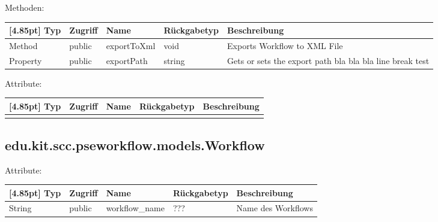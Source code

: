             Methoden:
            \begin{center}
	            \setlength\tabcolsep{5pt}
	            \renewcommand{\arraystretch}{1.5}
	            
                \begin{tabularx}{\textwidth}{|l|l|l|l|X|}
                    \hline
                    \rowcolor[gray]{0.75}[4.85pt]
                    Typ & Zugriff & Name & Rückgabetyp & Beschreibung \\ \hline 
                    Method & public & exportToXml & void & Exports Workflow to XML File \\ \hline
                    Property & public & exportPath & string & Gets or sets the export path bla bla bla line break test\\
                    \hline
                \end{tabularx}
            \end{center}
                
            Attribute:
            \begin{center}
            	\renewcommand{\arraystretch}{1.5}
	            \setlength\tabcolsep{5pt}
            	\begin{tabularx}{\textwidth}{|l|l|l|l|X|}
            		\hline
                    \rowcolor[gray]{0.75}[4.85pt]            		
            	    Typ & Zugriff & Name & Rückgabetyp & Beschreibung \\ \hline 
            	   	&&&&\\
            		\hline
            	\end{tabularx}
            \end{center}
%            
%        
        \subsection{edu.kit.scc.pseworkflow.models.Workflow}
            Attribute:
            \begin{center}
            	\renewcommand{\arraystretch}{1.5}
	            \setlength\tabcolsep{5pt}
            	\begin{tabularx}{\textwidth}{|l|l|l|l|X|}
            		\hline
                    \rowcolor[gray]{0.75}[4.85pt]            		
            	    Typ & Zugriff & Name & Rückgabetyp & Beschreibung \\ \hline
            		String & public & workflow\_name & ??? & Name des Workflows \\ \hline
            		
            	\end{tabularx}
            \end{center}
            
